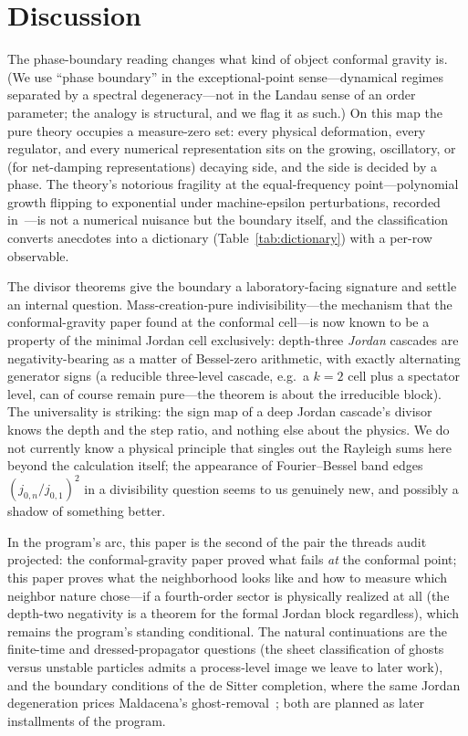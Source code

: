 ﻿\documentclass[11pt]{article}
\theoremstyle{remark}
\begin{document}
\section{Discussion}
\label{sec:discussion}

The phase-boundary reading changes what kind of object conformal
gravity is. (We use ``phase boundary'' in the exceptional-point
sense---dynamical regimes separated by a spectral
degeneracy---not in the Landau sense of an order parameter; the
analogy is structural, and we flag it as such.) On this map the pure theory occupies a measure-zero
set: every physical deformation, every regulator, and every
numerical representation sits on the growing, oscillatory, or (for
net-damping representations) decaying side, and the
side is decided by a phase. The theory's notorious fragility at the
equal-frequency point---polynomial growth flipping to exponential
under machine-epsilon perturbations, recorded
in~\cite{choosing}---is not a numerical nuisance but the boundary
itself, and the classification converts anecdotes into a dictionary
(Table~\ref{tab:dictionary}) with a per-row observable.

The divisor theorems give the boundary a laboratory-facing
signature and settle an internal question. Mass-creation-pure
indivisibility---the mechanism that the conformal-gravity paper found
at the conformal cell---is now known to be a property of the minimal Jordan cell
exclusively: depth-three \emph{Jordan} cascades are
negativity-bearing as a matter of Bessel-zero arithmetic, with
exactly alternating generator signs (a reducible three-level
cascade, e.g.\ a $k=2$ cell plus a spectator level, can of course
remain pure---the theorem is about the irreducible block). The universality is striking: the sign map of a
deep Jordan cascade's divisor knows the depth and the step ratio,
and
nothing else about the physics. We do not currently know a
physical principle that singles out the Rayleigh sums here beyond
the calculation itself; the appearance of Fourier--Bessel band
edges $(j_{0,n}/j_{0,1})^2$ in a divisibility question seems to us
genuinely new, and possibly a shadow of something better.

In the program's arc, this paper is the second of the pair the
threads audit projected: the conformal-gravity paper proved what fails \emph{at} the
conformal point; this paper proves what the neighborhood looks
like and how to measure which neighbor nature chose---if a
fourth-order sector is physically realized at all (the depth-two negativity is a
theorem for the formal Jordan block regardless), which remains the program's
standing conditional. The natural continuations are the
finite-time and dressed-propagator questions (the sheet
classification of ghosts versus unstable particles admits a
process-level image we leave to later work), and the boundary
conditions of the de Sitter completion, where the same Jordan
degeneration prices Maldacena's
ghost-removal~\cite{Maldacena2011}; both are planned
as later installments of the program.
\end{document}
